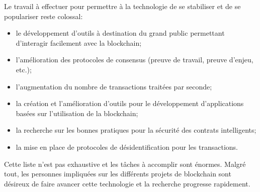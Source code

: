 \documentclass{tnreport}
\begin{document}
Le travail à effectuer pour permettre à la technologie de se stabiliser et de se populariser reste colossal:
\begin{itemize}
	\item le développement d'outils à destination du grand public permettant d'interagir facilement avec la blockchain;
	\item l'amélioration des protocoles de consensus (preuve de travail, preuve d'enjeu, etc.);
	\item l'augmentation du nombre de transactions traitées par seconde;
	\item la création et l'amélioration d'outils pour le développement d'applications basées sur l'utilisation de la blockchain;
	\item la recherche sur les bonnes pratiques pour la sécurité des contrats intelligents;
	\item la mise en place de protocoles de désidentification pour les transactions.
	\newline
\end{itemize}
Cette liste n'est pas exhaustive et les tâches à accomplir sont énormes.
Malgré tout, les personnes impliquées sur les différents projets de blockchain sont désireux de faire avancer cette technologie et la recherche progresse rapidement.
\end{document}
